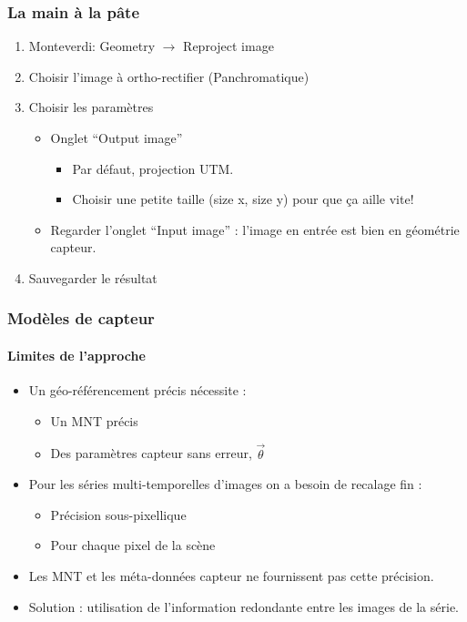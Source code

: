 \documentclass[compress,handout]{beamer}
\begin{document}
\begin{frame}
\frametitle{La main à la pâte}
\begin{enumerate}
\item Monteverdi: Geometry $\rightarrow$ Reproject image
\item Choisir l'image à ortho-rectifier (Panchromatique)
\item Choisir les paramètres
  \begin{itemize}
  \item Onglet ``Output image''
    \begin{itemize}
    \item Par défaut, projection UTM.
    \item Choisir une petite taille (size x, size y) pour que ça aille
    vite!
    \end{itemize}
  \item Regarder l'onglet ``Input image'' : l'image en entrée est bien
    en géométrie capteur.
  \end{itemize}
\item Sauvegarder le résultat

\end{enumerate}
\end{frame}


\begin{frame}
  \frametitle{Modèles de capteur}
  \framesubtitle{Limites de l'approche}

  \begin{itemize}
    \item Un géo-référencement précis nécessite :
      \begin{itemize}
	\item Un MNT précis
	\item Des paramètres capteur sans erreur, $\vec\theta$
      \end{itemize}
    \item Pour les séries multi-temporelles d'images on a besoin de
      \alert{recalage fin} :
      \begin{itemize}
      \item Précision sous-pixellique
      \item Pour chaque pixel de la scène
      \end{itemize}
    \item Les MNT et les méta-données capteur ne fournissent pas cette
      précision.
    \item Solution : utilisation de l'information redondante entre les
      images de la série.
  \end{itemize}
\end{frame}
\end{document}
